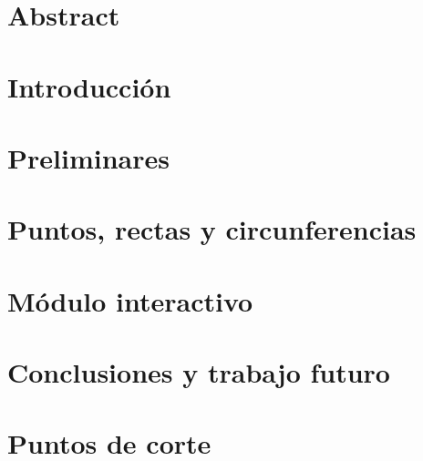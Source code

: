 \documentclass[12pt,a4paper]{book}
\begin{document}
\newcommand{\codesize}{\small}
%
\frontmatter

\chapter*{Abstract}

\tableofcontents

\mainmatter
\chapter{Introducción}\label{ch:intro}

\chapter{Preliminares}\label{cap.2}

\chapter{Puntos, rectas y circunferencias}\label{cap.3}

\chapter{Módulo interactivo}\label{cap.4}

\chapter{Conclusiones y trabajo futuro}\label{cap.5}

\appendix
\chapter{Puntos de corte}

\backmatter

\end{document}
